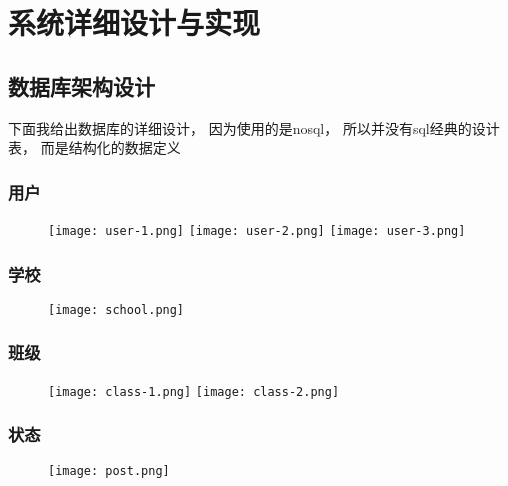\chapter{系统详细设计与实现}

\section{数据库架构设计}

下面我给出数据库的详细设计， 因为使用的是nosql， 所以并没有sql经典的设计表， 而是结构化的数据定义

\subsection{用户}

\begin{figure}[H]
	\centering
        \texttt{[image: user-1.png]}
        \texttt{[image: user-2.png]}
        \texttt{[image: user-3.png]}
	\label{fig:user-defined}
\end{figure}


\subsection{学校}


\begin{figure}[H]
	\centering
        \texttt{[image: school.png]}
	\label{fig:school-defined}
\end{figure}

\subsection{班级}

\begin{figure}[H]
	\centering
        \texttt{[image: class-1.png]}
        \texttt{[image: class-2.png]}
	\label{fig:class-defined}
\end{figure}

\subsection{状态}

\begin{figure}[H]
	\centering
        \texttt{[image: post.png]}
	\label{fig:post-defined}
\end{figure}

